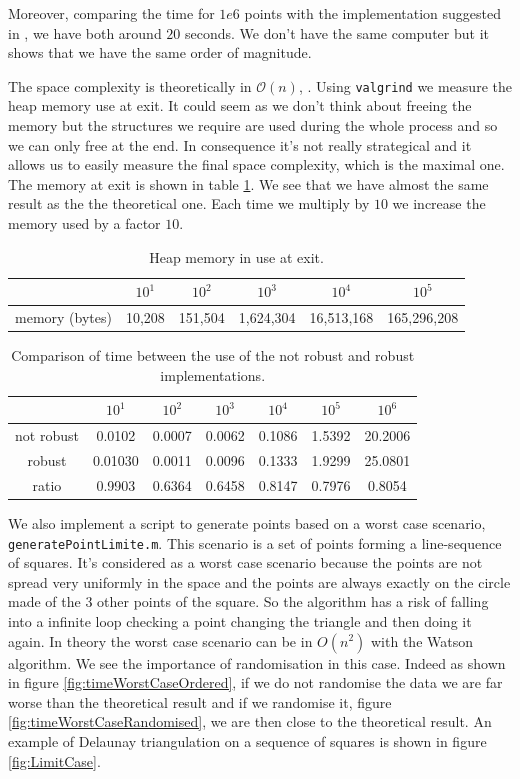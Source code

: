 Moreover, comparing the time for $1e6$ points with the implementation suggested in \cite{triangle}, we have both around $20$ seconds. We don't have the same computer but it shows that we have the same order of magnitude.

The space complexity is theoretically in $\mathcal{O}(n)$, \cite{de2000computational}. Using \texttt{valgrind} we measure the heap memory use at exit. It could seem as we don't think about freeing the memory but the structures we require are used during the whole process and so we can only free at the end. In consequence it's not really strategical and it allows us to easily measure the final space complexity, which is the maximal one. The memory at exit is shown in table \ref{tab:memory}. We see that we have almost the same result as the the theoretical one. Each time we multiply by $10$ we increase the memory used by a factor $10$.

\begin{table}
\centering
\begin{tabular}{c|ccccc}
				& $10^1$ & $10^2$ 	  & $10^3$	 & $10^4$	& $10^5$ \\
				\hline
memory (bytes) & 10,208 & 151,504 & 1,624,304 & 16,513,168 &  165,296,208 \\
\end{tabular}
\caption{Heap memory in use at exit.}
\label{tab:memory}
\end{table}

\begin{table}
\centering
\begin{tabular}{c|cccccc}
	 & $10^1$ & $10^2$ 	 & $10^3$ 	& $10^4$ 	& $10^5$ & $10^6$ \\
	 \hline
not robust &0.0102 & 0.0007 &	0.0062 & 0.1086 &	1.5392 &	20.2006 \\
 robust & 0.01030 &	0.0011 &	0.0096 & 0.1333 &	1.9299 &	25.0801 \\	 
ratio & 0.9903 &  0.6364  &  0.6458   & 0.8147  &  0.7976  &  0.8054\\
\end{tabular}
\caption{Comparison of time between the use of the not robust and robust implementations. }
\label{tab:proportion}
\end{table}

We also implement a script to generate points based on a worst case scenario, \texttt{generatePointLimite.m}. This scenario is a set of points forming a line-sequence of squares. It's considered as a worst case scenario because the points are not spread very uniformly in the space and the points are always exactly on the circle made of the $3$ other points of the square. So the algorithm has a risk of falling into a infinite loop checking a point changing the triangle and then doing it again. In theory the worst case scenario can be in $O(n^2)$ with the Watson algorithm. We see the importance of randomisation in this case. Indeed as shown in figure \ref{fig:timeWorstCaseOrdered}, if we do not randomise the data we are far worse than the theoretical result and if we randomise it, figure \ref{fig:timeWorstCaseRandomised}, we are then close to the theoretical result.  An example of Delaunay triangulation on a sequence of squares is shown in figure \ref{fig:LimitCase}.

